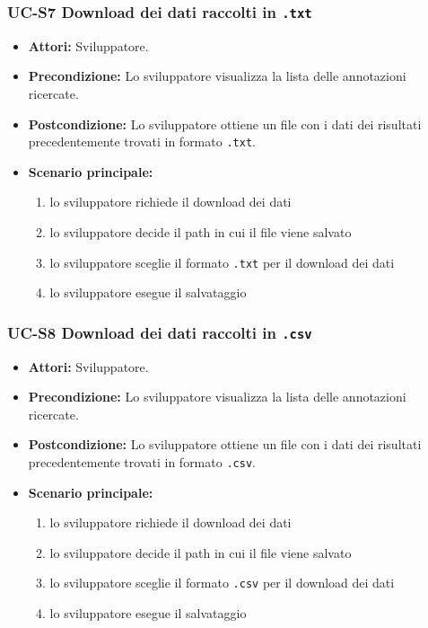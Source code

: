 \subsubsection{UC-S7 Download dei dati raccolti in \texttt{.txt}}
		\begin{itemize}
			\item \textbf{Attori:} Sviluppatore.
			\item \textbf{Precondizione:} Lo sviluppatore visualizza la lista delle annotazioni ricercate.
			\item \textbf{Postcondizione:} Lo sviluppatore ottiene un file con i dati dei risultati precedentemente trovati in formato \texttt{.txt}.
			\item \textbf{Scenario principale:}
				\begin{enumerate}
					\item lo sviluppatore richiede il download dei dati
					\item lo sviluppatore decide il path in cui il file viene salvato
					\item lo sviluppatore sceglie il formato \texttt{.txt} per il download dei dati
					\item lo sviluppatore esegue il salvataggio
				\end{enumerate}
		\end{itemize}

\subsubsection{UC-S8 Download dei dati raccolti in \texttt{.csv}}
		\begin{itemize}
			\item \textbf{Attori:} Sviluppatore.
			\item \textbf{Precondizione:} Lo sviluppatore visualizza la lista delle annotazioni ricercate.
			\item \textbf{Postcondizione:} Lo sviluppatore ottiene un file con i dati dei risultati precedentemente trovati in formato \texttt{.csv}.
			\item \textbf{Scenario principale:}
				\begin{enumerate}
					\item lo sviluppatore richiede il download dei dati
					\item lo sviluppatore decide il path in cui il file viene salvato
					\item lo sviluppatore sceglie il formato \texttt{.csv} per il download dei dati
					\item lo sviluppatore esegue il salvataggio
				\end{enumerate}
		\end{itemize}

